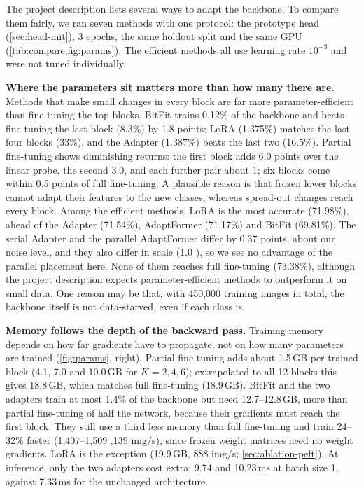 The project description lists several ways to adapt the backbone.
To compare them fairly, we ran seven methods with one protocol: the prototype head (\cref{sec:head-init}), 3 epochs, the same holdout split and the same GPU (\cref{tab:compare,fig:params}).
The efficient methods all use learning rate $10^{-3}$ and were not tuned individually.

\textbf{Where the parameters sit matters more than how many there are.}
Methods that make small changes in every block are far more parameter-efficient than fine-tuning the top blocks.
BitFit trains 0.12\% of the backbone and beats fine-tuning the last block (8.3\%) by 1.8 points; LoRA (1.375\%) matches the last four blocks (33\%), and the Adapter (1.387\%) beats the last two (16.5\%).
Partial fine-tuning shows diminishing returns: the first block adds 6.0 points over the linear probe, the second 3.0, and each further pair about 1; six blocks come within 0.5 points of full fine-tuning.
A plausible reason is that frozen lower blocks cannot adapt their features to the new classes, whereas spread-out changes reach every block.
Among the efficient methods, LoRA is the most accurate (71.98\%), ahead of the Adapter (71.54\%), AdaptFormer (71.17\%) and BitFit (69.81\%).
The serial Adapter and the parallel AdaptFormer differ by 0.37 points, about our noise level, and they also differ in scale (1.0 ), so we see no advantage of the parallel placement here.
None of them reaches full fine-tuning (73.38\%), although the project description expects parameter-efficient methods to outperform it on small data.
One reason may be that, with 450,000 training images in total, the backbone itself is not data-starved, even if each class is.

\textbf{Memory follows the depth of the backward pass.}
Training memory depends on how far gradients have to propagate, not on how many parameters are trained (\cref{fig:params}, right).
Partial fine-tuning adds about 1.5\,GB per trained block (4.1, 7.0 and 10.0\,GB for $K = 2, 4, 6$); extrapolated to all 12 blocks this gives 18.8\,GB, which matches full fine-tuning (18.9\,GB).
BitFit and the two adapters train at most 1.4\% of the backbone but need 12.7--12.8\,GB, more than partial fine-tuning of half the network, because their gradients must reach the first block.
They still use a third less memory than full fine-tuning and train 24--32\% faster (1,407--1,509 ,139 img/s), since frozen weight matrices need no weight gradients.
LoRA is the exception (19.9\,GB, 888 img/s; \cref{sec:ablation-peft}).
At inference, only the two adapters cost extra: 9.74 and 10.23\,ms at batch size 1, against 7.33\,ms for the unchanged architecture.

